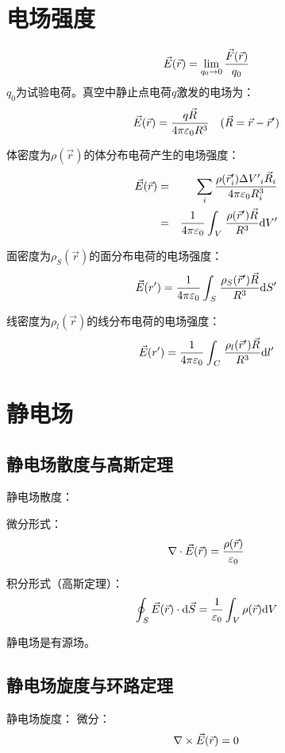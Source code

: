 \section{电场强度}
$$\vec E(\vec r) = \mathop {{\rm{lim}}}\limits_{{q_0} \to 0} {{\vec F(\vec r)} \over {{q_0}}}$$
${q_0}$为试验电荷。真空中静止点电荷$q$激发的电场为：
$$\vec E(\vec r) = {{q\vec R} \over {4{\rm{\pi }}{\varepsilon _0}{R^3}}} \quad(\vec R = \vec r - \vec r')$$

体密度为$\rho(\vec{r})$的体分布电荷产生的电场强度：
\begin{eqnarray*}
	\vec E(\vec r) &=& \sum\limits_i {{{\rho ({{\vec r'}_i}){\rm{\Delta }}{{V'}_i}{{\vec R}_i}} \over {4{\rm{\pi }}{\varepsilon _0}R_i^3}}} \\
	&=&{1 \over {4{\rm{\pi }}{\varepsilon _0}}}\int_{{\kern 1pt} V} {{\kern 1pt} {{\rho (\vec r')\vec R} \over {{R^3}}}{\rm{d}}V'}
\end{eqnarray*}

面密度为$\rho_S(\vec{r})$的面分布电荷的电场强度：
$$\vec E(r') = {1 \over {4{\rm{\pi }}{\varepsilon _0}}}\int_{{\kern 1pt} S} {{\kern 1pt} {{{\rho _S}(\vec r')\vec R} \over {{R^3}}}{\rm{d}}S'} $$


线密度为$\rho_l(\vec{r})$的线分布电荷的电场强度：
$$\vec E(r') = {1 \over {4{\rm{\pi }}{\varepsilon _0}}}\int_{{\kern 1pt} C} {{\kern 1pt} {{{\rho _l}(\vec r')\vec R} \over {{R^3}}}{\rm{d}}l'} $$

\section{静电场}
\subsection*{静电场散度与高斯定理}
静电场散度：

微分形式：$$\nabla  \cdot \vec E{\rm{(}}\vec r{\rm{)}} = {{\rho {\rm{(}}\vec r{\rm{)}}} \over {{\varepsilon _0}}}$$

积分形式（高斯定理）：$$\oint_{{\kern 1pt} S} {\vec E{\rm{(}}\vec r{\rm{)}} \cdot {\rm{d}}\vec S}  = {1 \over {{\varepsilon _0}}}\int_{{\kern 1pt} V} {\rho {\rm{(}}\vec r{\rm{)d}}V} $$

静电场是有源场。

\subsection*{静电场旋度与环路定理}
静电场旋度：
微分：$$\nabla  \times \vec E{\rm{(}}\vec r{\rm{)}} = 0$$

